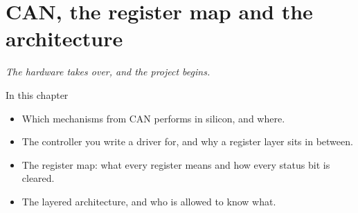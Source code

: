 \chapter{CAN, the register map and the architecture}
\label{ch:can}


{\large\itshape The hardware takes over, and the project begins.\par}

\begin{chapterbox}{In this chapter}
\begin{itemize}
  \item Which mechanisms from  CAN performs in silicon, and where.
  \item The controller you write a driver for, and why a register layer sits in between.
  \item The register map: what every register means and how every status bit is cleared.
  \item The layered architecture, and who is allowed to know what.
\end{itemize}
\end{chapterbox}







